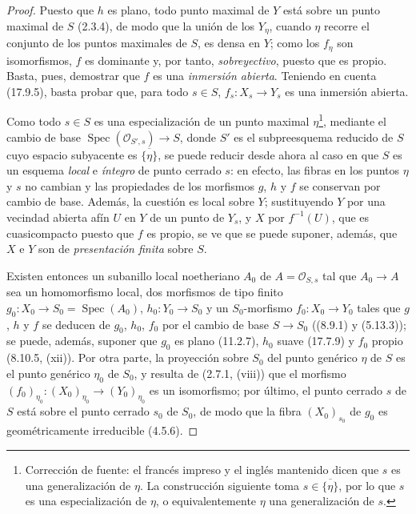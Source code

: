 \begin{proof}
Puesto que $h$ es plano, todo punto maximal de $Y$ está sobre un punto maximal de $S$
(2.3.4), de modo que la unión de los $Y_\eta$, cuando $\eta$ recorre el conjunto de los puntos
maximales de $S$, es densa en $Y$; como los $f_\eta$ son isomorfismos, $f$
es dominante y, por tanto, \emph{sobreyectivo}, puesto que es propio. Basta, pues, demostrar
que $f$ es una \emph{inmersión abierta}. Teniendo en cuenta (17.9.5), basta probar
que, para todo $s\in S$, $f_s:X_s\to Y_s$ es una inmersión abierta.

Como todo $s\in S$ es una especialización de un punto maximal $\eta$\footnote{Corrección de fuente: el francés impreso y el inglés mantenido dicen que $s$ es una generalización de $\eta$. La construcción siguiente toma $s\in\overline{\{\eta\}}$, por lo que $s$ es una especialización de $\eta$, o equivalentemente $\eta$ una generalización de $s$.}, mediante el
cambio de base $\operatorname{Spec}(\mathcal O_{S',s})\to S$, donde $S'$ es el
subpreesquema reducido de $S$ cuyo espacio subyacente es $\overline{\{\eta\}}$,
se puede reducir desde ahora al caso en que $S$ es un esquema \emph{local} e \emph{íntegro} de punto cerrado $s$:
en efecto, las fibras en los puntos $\eta$ y $s$ no cambian y las propiedades de los
morfismos $g$, $h$ y $f$ se conservan por cambio de base. Además, la cuestión
es local sobre $Y$; sustituyendo $Y$ por una vecindad abierta afín $U$ en $Y$ de un punto
de $Y_s$, y $X$ por $f^{-1}(U)$, que es cuasicompacto puesto que $f$ es propio, se ve
que se puede suponer, además, que $X$ e $Y$ son de \emph{presentación finita} sobre $S$.

Existen entonces un subanillo local noetheriano $A_0$ de
$A=\mathcal O_{S,s}$ tal que $A_0\to A$ sea un homomorfismo local, dos morfismos
de tipo finito $g_0:X_0\to S_0=\operatorname{Spec}(A_0)$,
$h_0:Y_0\to S_0$ y un $S_0$-morfismo
$f_0:X_0\to Y_0$ tales que $g$, $h$ y $f$ se deducen de $g_0$, $h_0$, $f_0$ por el
cambio de base $S\to S_0$ ((8.9.1) y (5.13.3)); se puede, además, suponer que $g_0$ es
plano (11.2.7), $h_0$ suave (17.7.9) y $f_0$ propio (8.10.5, (xii)). Por otra parte, la
proyección sobre $S_0$ del punto genérico $\eta$ de $S$ es el punto genérico $\eta_0$ de
$S_0$, y resulta de (2.7.1, (viii)) que el morfismo
$(f_0)_{\eta_0}:(X_0)_{\eta_0}\to(Y_0)_{\eta_0}$ es un isomorfismo; por último, el punto
cerrado $s$ de $S$ está sobre el punto cerrado $s_0$ de $S_0$, de modo que la fibra
$(X_0)_{s_0}$ de $g_0$ es geométricamente irreducible (4.5.6).


\end{proof}
